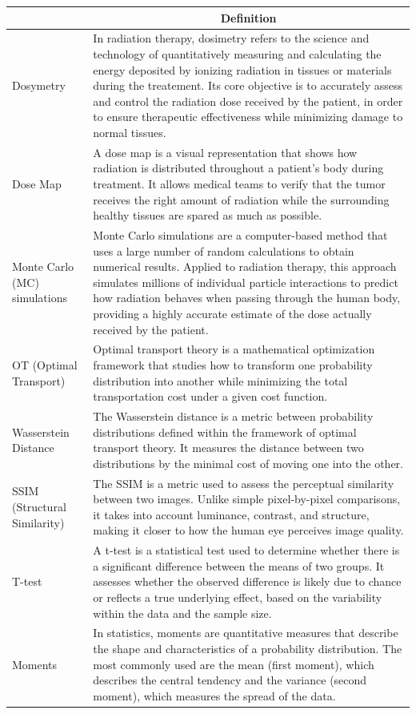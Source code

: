 \documentclass[12pt]{article}
\begin{document}
\begin{tabular}{|>{\centering\arraybackslash}p{5cm}|p{10cm}|}
\hline
\multicolumn{1}{|c|}{\textbf{Term}} & \multicolumn{1}{c|}{\textbf{Definition}}  \\ 
\hline
Dosymetry & In radiation therapy, dosimetry refers to the science and technology of quantitatively measuring and calculating the energy deposited by ionizing radiation in tissues or materials during the treatement. Its core objective is to accurately assess and control the radiation dose received by the patient, in order to ensure therapeutic effectiveness while minimizing damage to normal tissues. \\ 
\hline
Dose Map & A dose map is a visual representation that shows how radiation is distributed throughout a patient's body during treatment. It allows medical teams to verify that the tumor receives the right amount of radiation while the surrounding healthy tissues are spared as much as possible. \\ 
\hline
Monte Carlo (MC) simulations & Monte Carlo simulations are a computer-based method that uses a large number of random calculations to obtain numerical results. Applied to radiation therapy, this approach simulates millions of individual particle interactions to predict how radiation behaves when passing through the human body, providing a highly accurate estimate of the dose actually received by the patient. \\ 
\hline
OT (Optimal Transport) &  Optimal transport theory is a mathematical optimization framework that studies how to transform one probability distribution into another while minimizing the total transportation cost under a given cost function.\\ 
\hline
Wasserstein Distance &  The Wasserstein distance is a metric between probability distributions defined within the framework of optimal transport theory. It measures the distance between two distributions by the minimal cost of moving one into the other.\\ 
\hline
SSIM (Structural Similarity) & The SSIM is a metric used to assess the perceptual similarity between two images. Unlike simple pixel-by-pixel comparisons, it takes into account luminance, contrast, and structure, making it closer to how the human eye perceives image quality. \\ 
\hline
T-test & A t-test is a statistical test used to determine whether there is a significant difference between the means of two groups. It assesses whether the observed difference is likely due to chance or reflects a true underlying effect, based on the variability within the data and the sample size. \\ 
\hline
Moments & In statistics, moments are quantitative measures that describe the shape and characteristics of a probability distribution. The most commonly used are the mean (first moment), which describes the central tendency and the variance (second moment), which measures the spread of the data. \\ 
\hline
\end{tabular}
\end{document}

